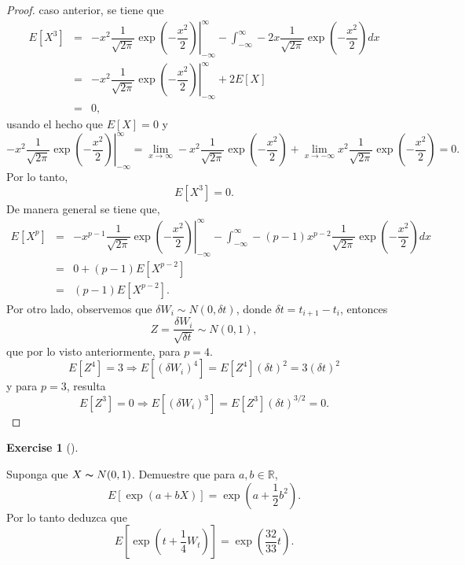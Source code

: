 \documentclass[
  letterpaper,
  DIV=11,
  numbers=noendperiod]{scrreprt}
\theoremstyle{plain}
\theoremstyle{definition}
\newtheorem{exercise}{Exercise}[chapter]
\theoremstyle{remark}
\begin{document}
\begin{proof}
caso anterior, se tiene que \[
\begin{eqnarray*}
    E\left[X^{3}\right] & = & \left.-x^{2}\dfrac{1}{\sqrt{2\pi}}\exp{\left(-\dfrac{x^{2}}{2}\right)}\right|_{-\infty}^{\infty}-\int_{-\infty}^{\infty} -2x\dfrac{1}{\sqrt{2\pi}}\exp{\left(-\dfrac{x^{2}}{2}\right)}dx\\
     & = & \left.-x^{2}\dfrac{1}{\sqrt{2\pi}}\exp{\left(-\dfrac{x^{2}}{2}\right)}\right|_{-\infty}^{\infty}+2E[X]\\
     & = & 0,
\end{eqnarray*}
\] usando el hecho que \(E[X]=0\) y \[
\left.-x^{2}\dfrac{1}{\sqrt{2\pi}}\exp{\left(-\dfrac{x^{2}}{2}\right)}\right|_{-\infty}^{\infty}=\lim_{x\to\infty}-x^{2}\dfrac{1}{\sqrt{2\pi}}\exp{\left(-\dfrac{x^{2}}{2}\right)}+\lim_{x\to-\infty}x^{2}\dfrac{1}{\sqrt{2\pi}}\exp{\left(-\dfrac{x^{2}}{2}\right)}=0.
\] Por lo tanto, \[
 E\left[X^{3}\right]=0.
 \] De manera general se tiene que, \[
\begin{eqnarray*}
    E\left[X^{p}\right] & = & \left.-x^{p-1}\dfrac{1}{\sqrt{2\pi}}\exp{\left(-\dfrac{x^{2}}{2}\right)}\right|_{-\infty}^{\infty}-\int_{-\infty}^{\infty} -(p-1)x^{p-2}\dfrac{1}{\sqrt{2\pi}}\exp{\left(-\dfrac{x^{2}}{2}\right)}dx\\
     & = & 0+(p-1)E[X^{p-2}]\\
     & = & (p-1)E[X^{p-2}].
\end{eqnarray*}
\] Por otro lado, observemos que
\(\delta W_{i}\sim N\left(0,\delta t\right)\), donde
\(\delta t=t_{i+1}-t_{i}\), entonces \[
Z=\dfrac{\delta W_{i}}{\sqrt{\delta t}}\sim N\left(0,1\right),
\] que por lo visto anteriormente, para \(p=4\). \[
E\left[Z^{4}\right]=3\Longrightarrow E[(\delta W_{i})^{4}]=E[Z^{4}](\delta t )^{2}=3(\delta t )^{2}
\] y para \(p=3\), resulta \[
E[Z^{3}]=0\Longrightarrow E[(\delta W_{i})^{3}]=E[Z^{3}](\delta t )^{3/2}=0.
\]

\end{proof}

\begin{exercise}[]\protect\hypertarget{exr-5}{}\label{exr-5}

Suponga que \(X\thicksim N(0,1)\). Demuestre que para
\(a, b\in\mathbb{R}\), \[
E[\exp(a+bX)]=\exp\left(a+\frac{1}{2}b^{2}\right).
\] Por lo tanto deduzca que \[
E[\exp(t+\frac{1}{4}W_{t})]=\exp\left(\frac{32}{33}t\right).
\]

\end{exercise}
\end{document}

